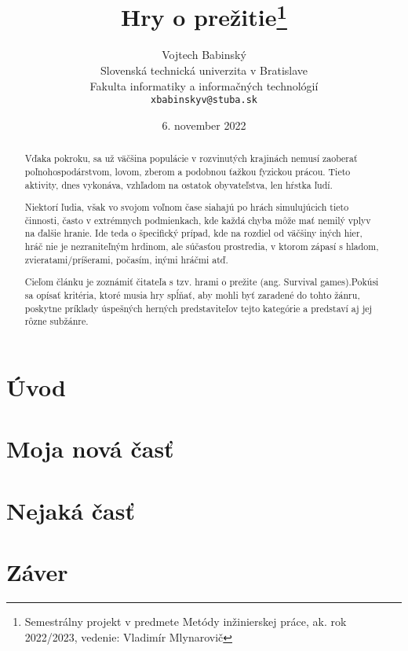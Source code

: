 \documentclass[10pt,twoside,slovak,a4paper]{article}
\title{Hry o prežitie\thanks{Semestrálny projekt v predmete Metódy inžinierskej práce, ak. rok 2022/2023, vedenie: Vladimír Mlynarovič}} %
\author{Vojtech Babinský\\[2pt]
	{\small Slovenská technická univerzita v Bratislave}\\
	{\small Fakulta informatiky a informačných technológií}\\
	{\small \texttt{xbabinskyv@stuba.sk}}
	}
\date{\small 6. november 2022} %
\begin{document}
\maketitle

\begin{abstract}

Vďaka pokroku, sa už väčšina populácie v rozvinutých krajinách nemusí zaoberať poľnohospodárstvom, lovom, zberom a podobnou ťažkou fyzickou prácou. Tieto aktivity, dnes vykonáva, vzhľadom na ostatok obyvateľstva, len hŕstka ľudí. 

Niektorí ľudia, však vo svojom voľnom čase siahajú po hrách simulujúcich tieto činnosti, často v extrémnych podmienkach, kde každá chyba môže mať nemilý vplyv na ďalšie hranie. Ide teda o špecifický prípad, kde na rozdiel od väčšiny iných hier, hráč nie je nezraniteľným hrdinom, ale súčasťou prostredia, v ktorom zápasí s hladom, zvieratami/príšerami, počasím, inými hráčmi atď. 

Cieľom článku je zoznámiť čitateľa s tzv. hrami o prežite (ang. Survival games).Pokúsi sa opísať kritéria, ktoré musia hry spĺňať, aby mohli byť zaradené do tohto žánru, poskytne príklady  úspešných herných predstaviteľov tejto kategórie a predstaví aj jej rôzne subžánre. 
\end{abstract}



\section{Úvod}



\section{Moja nová časť}



\section{Nejaká časť} \label{nejaka}

\cite{Reid}







\section{Záver} \label{zaver} %






\end{document}
